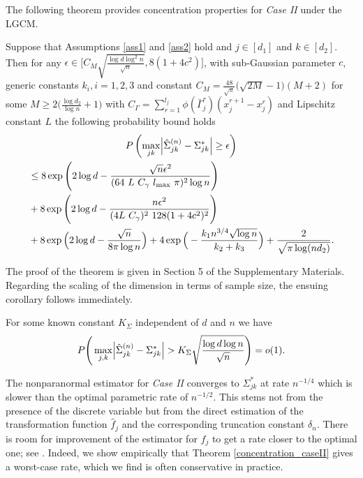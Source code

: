 \noindent The following theorem provides concentration properties for \textit{Case II} under the LGCM.
\begin{theorem}\label{concentration_caseII}
    Suppose that Assumptions \ref{ass1} and \ref{ass2} hold and $j \in [d_1]$ and $k \in [d_2]$. Then for any $\epsilon \in \Big[C_M\sqrt{\frac{\log d \log^2 n}{\sqrt{n}}},8(1+4c^2)\Big]$, with sub-Gaussian parameter $c$, generic constants $k_i, i = 1,2,3$ and constant $C_M = \frac{48}{\sqrt{\pi}} \big(\sqrt{2M} - 1\big)(M+2)$ for some $M \geq 2\big(\frac{\log d_2}{\log n} +1\big)$ with $C_\Gamma = \sum_{r=1}^{l_j} \phi(\bar{\Gamma}_j^r)(x_j^{r+1} - x_j^r)$ and Lipschitz constant $L$ the following probability bound holds
    \begin{multline*}
        P\left(\max_{jk}\abs{\hat{\Sigma}_{jk}^{(n)} -  \Sigma_{jk}^{*}} \geq \epsilon \right) \\
        \begin{aligned}
        &\leq 8\exp\Bigg(2\log d - \frac{\sqrt{n}\epsilon^2}{(64 \ L \ C_\gamma \ l_{\max} \ \pi)^2 \log n}\Bigg) \\
        &+ 8\exp\left( 2\log d - \frac{n \epsilon^2}{(4L \ C_\gamma)^2 \ 128(1+4c^2)^2} \right) \\
        &+ 8\exp\Big(2\log d - \frac{\sqrt{n}}{8\pi\log n}\Big) + 4\exp\Big(- \frac{k_1 n^{3/4} \sqrt{\log n}}{k_2+ k_3} \Big) + \frac{2}{\sqrt{\pi \log(nd_2)}}.
        \end{aligned}
    \end{multline*}

\end{theorem}
The proof of the theorem is given in Section 5
of the Supplementary Materials. Regarding the scaling of the dimension in terms of sample size, the ensuing corollary follows immediately.
\begin{corollary}
    For some known constant $K_{\Sigma}$ independent of $d$ and $n$ we have
    \begin{equation}
        P\Bigg(\max_{j,k}\abs{\hat{\Sigma}_{jk}^{(n)} - \Sigma_{jk}^*} > K_{\Sigma}\sqrt{\frac{\log d \log n}{\sqrt{n}}} \Bigg) = o(1).
    \end{equation}
\end{corollary}

The nonparanormal estimator for \textit{Case II} converges to \(\Sigma_{jk}^*\) at rate \(n^{-1/4}\) which is slower than the optimal parametric rate of \(n^{-1/2}\). This stems not from the presence of the discrete variable but from the direct estimation of the transformation function \(\hat{f}_j\) and the corresponding truncation constant \(\delta_n\). There is room for improvement of the estimator for \(f_j\) to get a rate closer to the optimal one; see \citep{Xue12}. Indeed, we show empirically that Theorem \ref{concentration_caseII} gives a worst-case rate, which we find is often conservative in practice.


